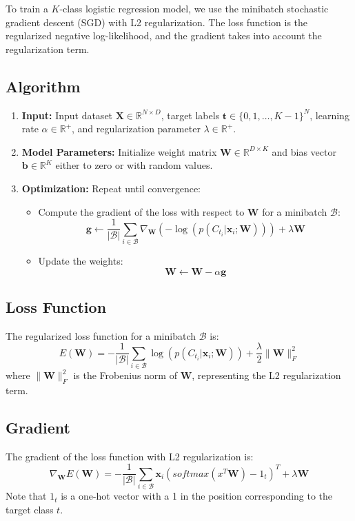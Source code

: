 \documentclass[11pt]{article}
\begin{document}
To train a \( K \)-class logistic regression model, we use the minibatch stochastic gradient descent (SGD) with L2 regularization. The loss function is the regularized negative log-likelihood, and the gradient takes into account the regularization term.

\subsection*{Algorithm}
\begin{enumerate}
    \item \textbf{Input:} Input dataset \( \mathbf{X} \in \mathbb{R}^{N \times D} \), target labels \( \mathbf{t} \in \{0, 1, \ldots, K-1\}^N \), learning rate \( \alpha \in \mathbb{R}^+ \), and regularization parameter \( \lambda \in \mathbb{R}^+ \).
    
    \item \textbf{Model Parameters:} Initialize weight matrix \( \mathbf{W} \in \mathbb{R}^{D \times K} \) and bias vector \( \mathbf{b} \in \mathbb{R}^K \) either to zero or with random values.
    
    \item \textbf{Optimization:} Repeat until convergence:
    \begin{itemize}
        \item Compute the gradient of the loss with respect to \( \mathbf{W} \) for a minibatch \( \mathcal{B} \):
        \[
        \mathbf{g} \leftarrow \frac{1}{|\mathcal{B}|} \sum_{i \in \mathcal{B}} \nabla_{\mathbf{W}} \left( -\log(p(C_{t_i} | \mathbf{x}_i; \mathbf{W})) \right) + \lambda \mathbf{W}
        \]
        
        \item Update the weights:
        \[
        \mathbf{W} \leftarrow \mathbf{W} - \alpha \mathbf{g}
        \]
    \end{itemize}
\end{enumerate}

\subsection*{Loss Function}
The regularized loss function for a minibatch \( \mathcal{B} \) is:
\[
E(\mathbf{W}) = -\frac{1}{|\mathcal{B}|} \sum_{i \in \mathcal{B}} \log(p(C_{t_i} | \mathbf{x}_i; \mathbf{W})) + \frac{\lambda}{2} \|\mathbf{W}\|^2_F
\]
where \( \|\mathbf{W}\|^2_F \) is the Frobenius norm of \( \mathbf{W} \), representing the L2 regularization term.

\subsection*{Gradient}
The gradient of the loss function with L2 regularization is:
\[
\nabla_{\mathbf{W}} E(\mathbf{W}) = -\frac{1}{|\mathcal{B}|} \sum_{i \in \mathcal{B}} \mathbf{x}_i(softmax(x^T \mathbf{W}) - 1_t)^T + \lambda \mathbf{W}
\]
Note that $1_t$ is a one-hot vector with a 1 in the position corresponding to the target class $t$.
\end{document}

